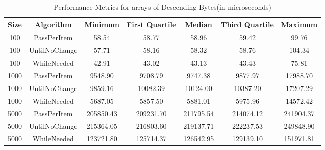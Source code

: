 \documentclass{article}
\begin{document}
\begin{table}[htbp]
    \centering
    \begin{tabular}{ccccccc}
        \toprule
        \textbf{Size} & \textbf{Algorithm} & \textbf{Minimum} & \textbf{First Quartile} & \textbf{Median} & \textbf{Third Quartile} & \textbf{Maximum} \\
        \midrule
        100 & PassPerItem & 58.54 & 58.77 & 58.96 & 59.42 & 99.76 \\
        100 & UntilNoChange & 57.71 & 58.16 & 58.32 & 58.76 & 104.34 \\
        100 & WhileNeeded & 42.91 & 43.02 & 43.13 & 43.43 & 75.81 \\
        1000 & PassPerItem & 9548.90 & 9708.79 & 9747.38 & 9877.97 & 17988.70 \\
        1000 & UntilNoChange & 9859.16 & 10082.39 & 10124.00 & 10387.20 & 17207.29 \\
        1000 & WhileNeeded & 5687.05 & 5857.50 & 5881.01 & 5975.96 & 14572.42 \\
        5000 & PassPerItem & 205850.43 & 209231.70 & 211795.54 & 214074.12 & 241904.37 \\
        5000 & UntilNoChange & 215364.05 & 216803.60 & 219137.71 & 222237.53 & 249848.90 \\
        5000 & WhileNeeded & 123721.80 & 125714.37 & 126542.95 & 129139.10 & 151971.81 \\
        \bottomrule
    \end{tabular}
    \caption{Performance Metrics for arrays of Descending Bytes(in microseconds)}
    \label{tab:performance_2}
\end{table}
\end{document}
